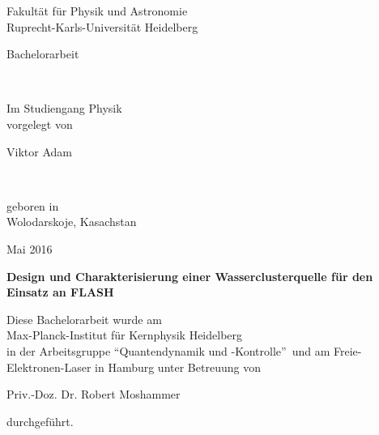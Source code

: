 
\thispagestyle{empty}
\begin{center}
  \renewcommand{\baselinestretch}{2.00}
  \Large\sffamily 
  Fakultät für Physik und Astronomie\\
  \large 
  Ruprecht-Karls-Universität Heidelberg
  \par\vfill\normalfont
  \begin{Large}Bachelorarbeit\end{Large}\\
\begin{normalsize}  Im Studiengang Physik\\
  vorgelegt von\\\end{normalsize}
  \begin{Large}Viktor Adam\end{Large}\\
\begin{normalsize}  geboren in\\
  Wolodarskoje, Kasachstan \\\end{normalsize}
  \begin{Large}Mai 2016\end{Large}
\end{center}


\cleardoublepage
\thispagestyle{empty}

\begin{center}
  \renewcommand{\baselinestretch}{1.50}
  \Large\bfseries\sffamily
    Design und Charakterisierung einer Wasserclusterquelle für den Einsatz an FLASH\\
  \vfill
  \normalfont
\begin{normalsize}  Diese Bachelorarbeit wurde am \\
  Max-Planck-Institut für Kernphysik Heidelberg \\
  in der Arbeitsgruppe \enquote{Quantendynamik und -Kontrolle}\ und am Freie-Elektronen-Laser in Hamburg unter Betreuung von \\\end{normalsize}
   Priv.-Doz. Dr. Robert Moshammer \\
 \begin{normalsize}  durchgeführt.\end{normalsize}
\end{center} %
\vspace{5\baselineskip}

\renewcommand{\baselinestretch}{1.00}\normalsize

\cleardoublepage

